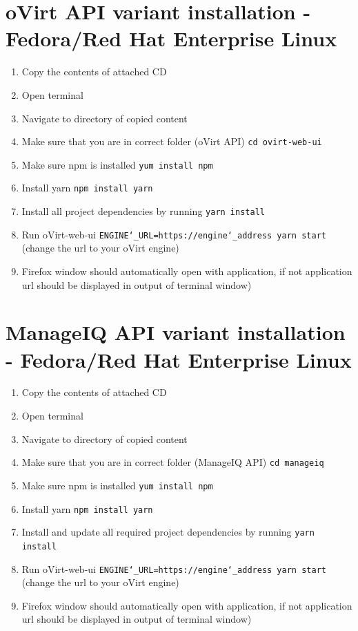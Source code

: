 \section{oVirt API variant installation - Fedora/Red Hat Enterprise Linux}
\begin{enumerate}

\item Copy the contents of attached CD 
\item Open terminal
\item Navigate to directory of copied content
\item Make sure that you are in correct folder (oVirt API) \texttt{cd ovirt-web-ui}
\item Make sure npm is installed \texttt{yum install npm}
\item Install yarn \texttt{npm install yarn}
\item Install all project dependencies by running \texttt{yarn install}
\item Run oVirt-web-ui \texttt{ENGINE\char`_URL=https://engine\char`_address yarn start} (change the url to your oVirt engine)
\item Firefox window should automatically open with application, if not application url should be displayed in output of terminal window)

\end{enumerate} 
\section{ManageIQ API variant installation - Fedora/Red Hat Enterprise Linux}
\begin{enumerate}

\item Copy the contents of attached CD 
\item Open terminal
\item Navigate to directory of copied content
\item Make sure that you are in correct folder (ManageIQ API) \texttt{cd manageiq}
\item Make sure npm is installed \texttt{yum install npm}
\item Install yarn \texttt{npm install yarn}
\item Install and update all required project dependencies by running \texttt{yarn install}
\item Run oVirt-web-ui \texttt{ENGINE\char`_URL=https://engine\char`_address yarn start} (change the url to your oVirt engine)
\item Firefox window should automatically open with application, if not application url should be displayed in output of terminal window)

\end{enumerate} 
